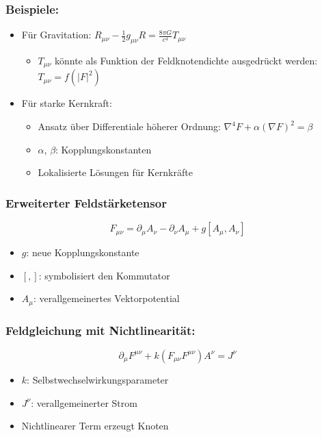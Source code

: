 \documentclass[12pt,a4paper]{article}
\begin{document}
	\subsubsection{Beispiele:}
	
	\begin{itemize}
		\item Für Gravitation: $R_{\mu\nu} - \frac{1}{2}g_{\mu\nu}R = \frac{8\pi G}{c^4} T_{\mu\nu}$
		\begin{itemize}
			\item $T_{\mu\nu}$ könnte als Funktion der Feldknotendichte ausgedrückt werden: $T_{\mu\nu} = f(|F|^2)$
		\end{itemize}
		\item Für starke Kernkraft:
		\begin{itemize}
			\item Ansatz über Differentiale höherer Ordnung: $\nabla^4 F + \alpha(\nabla F)^2 = \beta$
			\item $\alpha$, $\beta$: Kopplungskonstanten
			\item Lokalisierte Lösungen für Kernkräfte
		\end{itemize}
	\end{itemize}
	
	\subsubsection{Erweiterter Feldstärketensor}
	
	\begin{equation}
		F_{\mu\nu} = \partial_{\mu}A_{\nu} - \partial_{\nu}A_{\mu} + g[A_{\mu}, A_{\nu}]
	\end{equation}
	\begin{itemize}
		\item $g$: neue Kopplungskonstante
		\item $[,]$: symbolisiert den Kommutator
		\item $A_{\mu}$: verallgemeinertes Vektorpotential
	\end{itemize}
	
	\subsubsection{Feldgleichung mit Nichtlinearität:}
	\begin{equation}
		\partial_{\mu}F^{\mu\nu} + k(F_{\mu\nu}F^{\mu\nu})A^{\nu} = J^{\nu}
	\end{equation}
	\begin{itemize}
		\item $k$: Selbstwechselwirkungsparameter
		\item $J^{\nu}$: verallgemeinerter Strom
		\item Nichtlinearer Term erzeugt Knoten
	\end{itemize}
	
\end{document}
